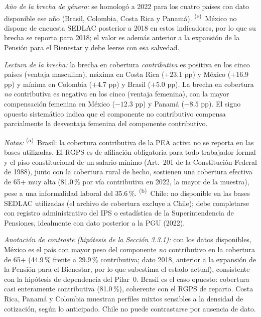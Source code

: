 \documentclass[12pt, letterpaper]{article}
\begin{document}
\begin{table}[h!]
\smallskip
\textit{Año de la brecha de género:} se homologó a 2022 para los cuatro países con dato disponible ese año (Brasil, Colombia, Costa Rica y Panamá). \textsuperscript{(c)}~México no dispone de encuesta SEDLAC posterior a 2018 en estos indicadores, por lo que su brecha se reporta para 2018; el valor es además anterior a la expansión de la Pensión para el Bienestar y debe leerse con esa salvedad.

\smallskip
\textit{Lectura de la brecha:} la brecha en cobertura \textit{contributiva} es positiva en los cinco países (ventaja masculina), máxima en Costa Rica ($+23.1$ pp) y México ($+16.9$ pp) y mínima en Colombia ($+4.7$ pp) y Brasil ($+5.0$ pp). La brecha en cobertura \textit{no} contributiva es negativa en los cinco (ventaja femenina), con la mayor compensación femenina en México ($-12.3$ pp) y Panamá ($-8.5$ pp). El signo opuesto sistemático indica que el componente no contributivo compensa parcialmente la desventaja femenina del componente contributivo.

\smallskip
\textit{Notas:} \textsuperscript{(a)}~Brasil: la cobertura contributiva de la PEA activa no se reporta en las bases utilizadas. El RGPS es de afiliación obligatoria para todo trabajador formal y el piso constitucional de un salario mínimo (Art.\ 201 de la Constitución Federal de 1988), junto con la cobertura rural de hecho, sostienen una cobertura efectiva de 65+ muy alta (81.0\,\% por vía contributiva en 2022, la mayor de la muestra), pese a una informalidad laboral del 35.6\,\%. \textsuperscript{(b)}~Chile: no disponible en las bases SEDLAC utilizadas (el archivo de cobertura excluye a Chile); debe completarse con registro administrativo del IPS o estadística de la Superintendencia de Pensiones, idealmente con dato posterior a la PGU (2022).

\smallskip
\textit{Anotación de contraste (hipótesis de la Sección 3.3.1):} con los datos disponibles, México es el país con mayor peso del componente \textit{no} contributivo en la cobertura de 65+ (44.9\,\% frente a 29.9\,\% contributiva; dato 2018, anterior a la expansión de la Pensión para el Bienestar, por lo que subestima el estado actual), consistente con la hipótesis de dependencia del Pilar~0. Brasil es el caso opuesto: cobertura casi enteramente contributiva (81.0\,\%), coherente con el RGPS de reparto. Costa Rica, Panamá y Colombia muestran perfiles mixtos sensibles a la densidad de cotización, según lo anticipado. Chile no puede contrastarse por ausencia de dato.
\end{table}
\end{document}
